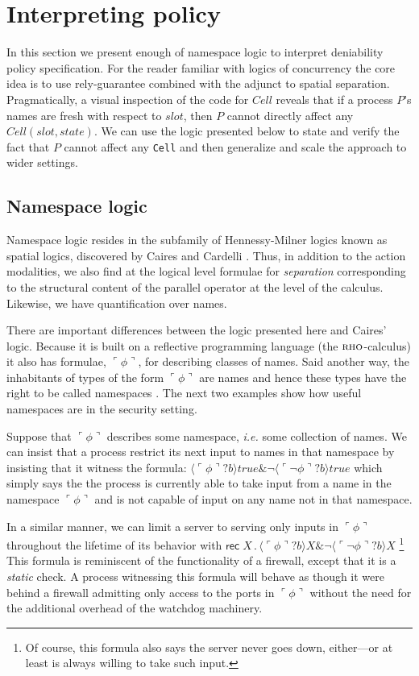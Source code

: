 \documentclass[submission,copyright,creativecommons]{eptcs}
\newcommand{\lpquote}{\ulcorner}
\newcommand{\rpquote}{\urcorner}
\newcommand{\ptrue}{\mathbin{true}}
\newcommand{\pquotep}[1]{\lpquote #1 \rpquote}
\newcommand{\pprefix}[3]{\langle #1 ? #2 \rangle #3}
\newcommand{\pgfp}[2]{\textsf{rec} \; #1 \mathbin{.} #2}
\numberwithin{equation}{subsection}
\newcommand{\rhoc}{${\textsc{rho}}$-calculus}
\begin{document}
\section{Interpreting policy}

In this section we present enough of namespace logic to interpret
deniability policy specification. For the reader familiar with logics
of concurrency the core idea is to use rely-guarantee combined with
the adjunct to spatial separation. Pragmatically, a visual inspection
of the code for $Cell$ reveals that if a process $P$'s names are fresh
with respect to $slot$, then $P$ cannot directly affect any $Cell(
slot, state )$. We can use the logic presented below to state and
verify the fact that $P$ cannot affect any {\tt Cell} and then
generalize and scale the approach to wider settings.

\subsection{Namespace logic}
Namespace logic resides in the subfamily of Hennessy-Milner logics
known as spatial logics, discovered by Caires and Cardelli
\cite{DBLP:conf/fossacs/Caires04}. Thus, in addition to the action
modalities, we also find at the logical level formulae for
\emph{separation} corresponding to the structural content of the
parallel operator at the level of the calculus. Likewise, we have
quantification over names. 

There are important differences between the logic presented here and
Caires' logic. Because it is built on a reflective programming language
(the \rhoc) it also has formulae, $\pquotep{\phi}$, for describing
classes of names. Said another way, the inhabitants of types of the
form $\pquotep{\phi}$ are names and hence these types have the right
to be called namespaces \cite{DBLP:conf/tgc/MeredithR05}. The next two
examples show how useful namespaces are in the security setting.

Suppose that $\pquotep{\phi}$ describes some namespace, {\em i.e.}
some collection of names. We can insist that a process restrict its
next input to names in that namespace by insisting that it witness the
formula: $\pprefix{\pquotep{\phi}}{b}{\ptrue} \& \neg
\pprefix{\pquotep{\neg \phi}}{b}{\ptrue}$ which simply says the the
process is currently able to take input from a name in the namespace
$\pquotep{\phi}$ and is not capable of input on any name not in that
namespace. 

In a similar manner, we can limit a server to serving only inputs in
$\pquotep{\phi}$ throughout the lifetime of its behavior with
$\pgfp{X}{\pprefix{\pquotep{\phi}}{b}{X} \& \neg
  \pprefix{\pquotep{\neg \phi}}{b}{X}} \nonumber$ \footnote{Of course,
  this formula also says the server never goes down, either---or at
  least is always willing to take such input.} This formula is
reminiscent of the functionality of a firewall, except that it is a
\emph{static} check. A process witnessing this formula will behave as
though it were behind a firewall admitting only access to the ports in
$\pquotep{\phi}$ without the need for the additional overhead of the
watchdog machinery.
\end{document}
